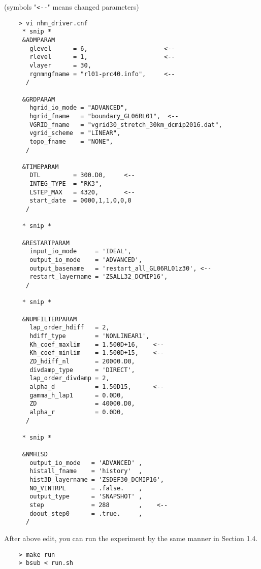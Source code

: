  \noindent (symbols "\verb|<--|" means changed parameters)
 \begin{verbatim}
    > vi nhm_driver.cnf
     * snip *
     &ADMPARAM
       glevel      = 6,                     <--
       rlevel      = 1,                     <--
       vlayer      = 30,
       rgnmngfname = "rl01-prc40.info",     <--
      /

     &GRDPARAM
       hgrid_io_mode = "ADVANCED",
       hgrid_fname   = "boundary_GL06RL01",  <--
       VGRID_fname   = "vgrid30_stretch_30km_dcmip2016.dat",
       vgrid_scheme  = "LINEAR",
       topo_fname    = "NONE",
      /

     &TIMEPARAM
       DTL         = 300.D0,     <--
       INTEG_TYPE  = "RK3",
       LSTEP_MAX   = 4320,       <--
       start_date  = 0000,1,1,0,0,0
      /

     * snip *

     &RESTARTPARAM
       input_io_mode     = 'IDEAL',
       output_io_mode    = 'ADVANCED',
       output_basename   = 'restart_all_GL06RL01z30', <--
       restart_layername = 'ZSALL32_DCMIP16',
      /

     * snip *

     &NUMFILTERPARAM
       lap_order_hdiff   = 2,
       hdiff_type        = 'NONLINEAR1',
       Kh_coef_maxlim    = 1.500D+16,    <--
       Kh_coef_minlim    = 1.500D+15,    <--
       ZD_hdiff_nl       = 20000.D0,
       divdamp_type      = 'DIRECT',
       lap_order_divdamp = 2,
       alpha_d           = 1.50D15,      <--
       gamma_h_lap1      = 0.0D0,
       ZD                = 40000.D0,
       alpha_r           = 0.0D0,
      /

     * snip *

     &NMHISD
       output_io_mode   = 'ADVANCED' ,
       histall_fname    = 'history'  ,
       hist3D_layername = 'ZSDEF30_DCMIP16',
       NO_VINTRPL       = .false.    ,
       output_type      = 'SNAPSHOT' ,
       step             = 288        ,    <--
       doout_step0      = .true.     ,
      /
 \end{verbatim}

 \noindent After above edit, you can run the experiment
 by the same manner in Section 1.4.
 \begin{verbatim}
    > make run
    > bsub < run.sh
 \end{verbatim}


